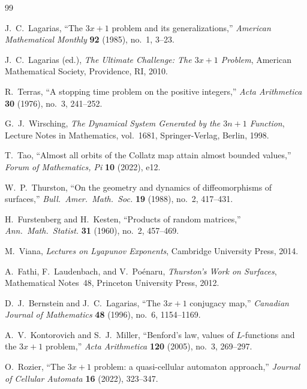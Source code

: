 \documentclass[11pt,a4paper]{article}
\theoremstyle{plain}
\theoremstyle{definition}
\begin{document}

\begin{thebibliography}{99}

J.~C.~Lagarias,
``The $3x+1$ problem and its generalizations,''
\emph{American Mathematical Monthly} \textbf{92} (1985), no.~1, 3--23.

J.~C.~Lagarias (ed.),
\emph{The Ultimate Challenge: The $3x+1$ Problem},
American Mathematical Society, Providence, RI, 2010.

R.~Terras,
``A stopping time problem on the positive integers,''
\emph{Acta Arithmetica} \textbf{30} (1976), no.~3, 241--252.

G.~J.~Wirsching,
\emph{The Dynamical System Generated by the $3n+1$ Function},
Lecture Notes in Mathematics, vol.~1681, Springer-Verlag, Berlin, 1998.

T.~Tao,
``Almost all orbits of the Collatz map attain almost bounded values,''
\emph{Forum of Mathematics, Pi} \textbf{10} (2022), e12.

W.~P.~Thurston,
``On the geometry and dynamics of diffeomorphisms of surfaces,''
\emph{Bull.\ Amer.\ Math.\ Soc.} \textbf{19} (1988), no.~2, 417--431.

H.~Furstenberg and H.~Kesten,
``Products of random matrices,''
\emph{Ann.\ Math.\ Statist.} \textbf{31} (1960), no.~2, 457--469.

M.~Viana,
\emph{Lectures on Lyapunov Exponents},
Cambridge University Press, 2014.

A.~Fathi, F.~Laudenbach, and V.~Po\'enaru,
\emph{Thurston's Work on Surfaces},
Mathematical Notes~48, Princeton University Press, 2012.

D.~J.~Bernstein and J.~C.~Lagarias,
``The $3x+1$ conjugacy map,''
\emph{Canadian Journal of Mathematics} \textbf{48} (1996), no.~6, 1154--1169.

A.~V.~Kontorovich and S.~J.~Miller,
``Benford's law, values of $L$-functions and the $3x+1$ problem,''
\emph{Acta Arithmetica} \textbf{120} (2005), no.~3, 269--297.

O.~Rozier,
``The $3x+1$ problem: a quasi-cellular automaton approach,''
\emph{Journal of Cellular Automata} \textbf{16} (2022), 323--347.

\end{thebibliography}
\end{document}
